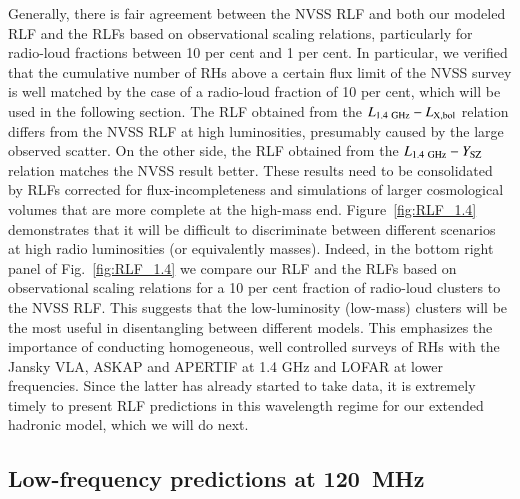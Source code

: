 \documentclass[useAMS,usenatbib]{mn2e}
\begin{document}
Generally, there is fair agreement between the NVSS RLF and both our modeled RLF
and the RLFs based on observational scaling relations, particularly for
radio-loud fractions between 10 per cent and 1 per cent. In particular, we
verified that the cumulative number of RHs above a certain flux limit of the
NVSS survey is well matched by the case of a radio-loud fraction of 10 per cent,
which will be used in the following section.  The RLF obtained from the
$L_{1.4~{\mathrm{GHz}}}-L_{{\mathrm{X,bol}}}$ relation differs from the NVSS RLF at high
luminosities, presumably caused by the large observed scatter.  On the other
side, the RLF obtained from the $L_{1.4~{\mathrm{GHz}}}-Y_{{\mathrm{SZ}}}$ relation
matches the NVSS result better. These results need to be consolidated by RLFs
corrected for flux-incompleteness and simulations of larger cosmological volumes
that are more complete at the high-mass end. Figure~\ref{fig:RLF_1.4}
demonstrates that it will be difficult to discriminate between different
scenarios at high radio luminosities (or equivalently masses). Indeed, in the
bottom right panel of Fig.~\ref{fig:RLF_1.4} we compare our RLF and the RLFs
based on observational scaling relations for a 10 per cent fraction of
radio-loud clusters to the NVSS RLF. This suggests that the low-luminosity
(low-mass) clusters will be the most useful in disentangling between different
models. This emphasizes the importance of conducting homogeneous, well
controlled surveys of RHs with the Jansky VLA, ASKAP \citep{2011PASA...28..215N}
and APERTIF \citep{2012JApA..tmp...34R} at 1.4 GHz and LOFAR at lower
frequencies. Since the latter has already started to take data, it is extremely
timely to present RLF predictions in this wavelength regime for our extended
hadronic model, which we will do next.


\subsection{Low-frequency predictions at 120~MHz}
\end{document}
